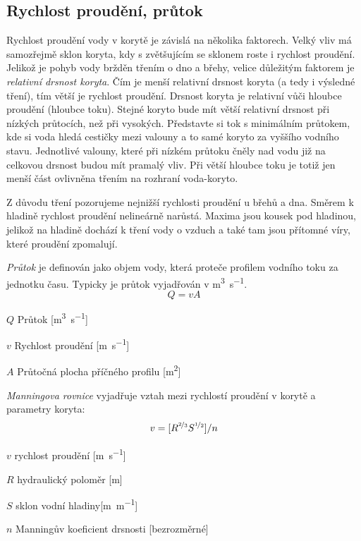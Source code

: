 \subsection{Rychlost proudění, průtok}
Rychlost proudění vody v korytě je závislá na několika faktorech. Velký vliv má samozřejmě sklon koryta, kdy s zvětšujícím se sklonem roste i rychlost proudění. Jelikož je pohyb vody bržděn třením o dno a břehy, velice důležitým faktorem je \emph{relativní drsnost koryta}. Čím je menší relativní drsnost koryta (a tedy i výsledné tření), tím větší je rychlost proudění. Drsnost koryta je relativní vůči hloubce proudění (hloubce toku). Stejné koryto bude mít větší relativní drsnost při nízkých průtocích, než při vysokých. Představte si tok s minimálním průtokem, kde si voda hledá cestičky mezi valouny a to samé koryto za vyššího vodního stavu. Jednotlivé valouny, které při nízkém průtoku čněly nad vodu již na celkovou drsnost budou mít pramalý vliv. Při větší hloubce toku je totiž jen menší část ovlivněna třením na rozhraní voda-koryto. 

Z důvodu tření pozorujeme nejnižší rychlosti proudění u břehů a dna. Směrem k hladině rychlost proudění nelineárně narůstá. Maxima jsou kousek pod hladinou, jelikož na hladině dochází k tření vody o vzduch a také tam jsou přítomné víry, které proudění zpomalují.

\emph{Průtok} je definován jako objem vody, která proteče profilem vodního toku za jednotku času. Typicky je průtok vyjadřován v \si{\metre\cubed\per\second}. 
\begin{equation}
	Q=vA
\end{equation}
\begin{eqexpl}
	\item{$Q$} Průtok [\si{\metre\cubed\per\second}]
	\item{$v$} Rychlost proudění [\si{\metre\per\second}]
	\item{$A$} Průtočná plocha příčného profilu [\si{\metre\squared}]
\end{eqexpl}


\emph{Manningova rovnice} vyjadřuje vztah mezi rychlostí proudění v korytě a parametry koryta:
\begin{equation}\label{eq:manning}
	v = [R^{\nicefrac{2}{3}}S^{\nicefrac{1}{2}}]/n
\end{equation}

\begin{eqexpl}
	\item{$v$} rychlost proudění [\si{\metre\per\second}]
	\item{$R$} hydraulický poloměr [\si{\metre}]
	\item{$S$} sklon vodní hladiny[\si{\metre\per\metre}]
	\item{$n$} Manningův koeficient drsnosti [bezrozměrné]
\end{eqexpl}

